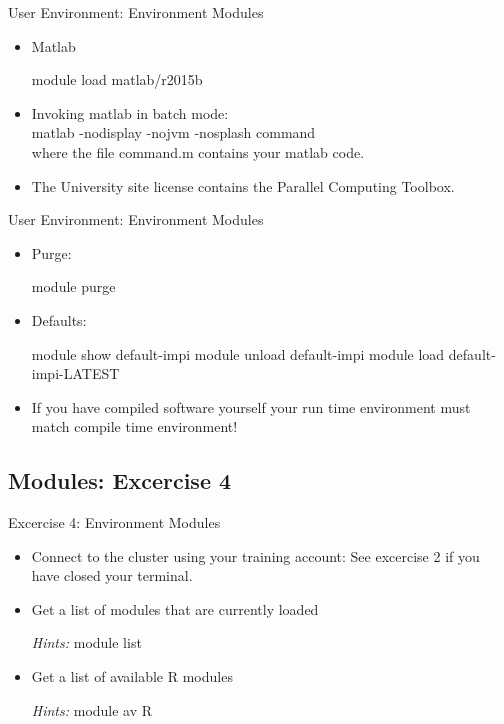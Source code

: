 \begin{frame}[fragile]{User Environment: Environment Modules}
\begin{itemize}
\item{Matlab}
\begin{semiverbatim}
\scriptsize
module load matlab/r2015b
\end{semiverbatim}
\medskip\pause
\item{Invoking matlab in batch mode:\hfill\\
  \qquad \alert{matlab -nodisplay -nojvm -nosplash command}\hfill\\
  where the file \alert{command.m} contains your matlab code.}
  \pause
  \item{The University site license contains the Parallel Computing Toolbox.}
\end{itemize}
\end{frame}

\begin{frame}[fragile]{User Environment: Environment Modules}
\begin{itemize}
\item{Purge:}
\begin{semiverbatim}
\scriptsize
module purge
\end{semiverbatim}
\smallskip
\item{Defaults:}
\begin{semiverbatim}
\scriptsize
module show default-impi
module unload default-impi
module load default-impi-LATEST
\end{semiverbatim}
\medskip
\item{If you have compiled software yourself your run time environment must match compile time environment!}
\end{itemize}
\end{frame}

\subsection{Modules: Excercise 4}
\begin{frame}[fragile]{Excercise 4: Environment Modules}
\begin{itemize}
\item{Connect to the cluster using your training account: See excercise 2 if you have closed your terminal. }
\item{Get a list of modules that are currently loaded}
\item[\emph{Hints:}]{\alert{module list}}
\item{Get a list of available R modules}
\item[\emph{Hints:}]{\alert{module av R}}
\end{itemize}
\end{frame}

